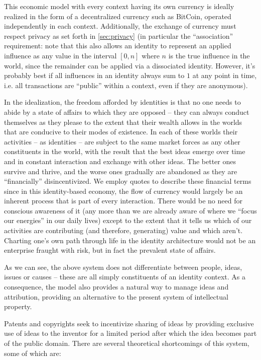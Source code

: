 \documentclass[pra,twocolumn,groupedaddress,10pt]{revtex4}
\theoremstyle{definition}
\begin{document}
This economic model with every context having its own currency is ideally realized in the form of a decentralized currency such as BitCoin\cite{bitcoin}, operated independently in each context. Additionally, the exchange of currency must respect privacy as set forth in \autoref{sec:privacy} (in particular the ``association'' requirement: note that this also allows an identity to represent an applied influence as any value in the interval $[0, n]$ where $n$ is the true influence in the world, since the remainder can be applied via a dissociated identity. However, it's probably best if all influences in an identity always sum to $1$ at any point in time, i.e. all transactions are ``public'' within a context, even if they are anonymous).

In the idealization, the freedom afforded by identities is that no one needs to abide by a state of affairs to which they are opposed -- they can always conduct themselves as they please to the extent that their wealth allows in the worlds that are conducive to their modes of existence. In each of these worlds their activities -- as identities -- are subject to the same market forces as any other constituents in the world, with the result that the best ideas emerge over time and in constant interaction and exchange with other ideas. The better ones survive and thrive, and the worse ones gradually are abandoned as they are ``financially'' disincentivized. We employ quotes to describe these financial terms since in this identity-based economy, the flow of currency would largely be an inherent process that is part of every interaction. There would be no need for conscious awareness of it (any more than we are already aware of where we ``focus our energies'' in our daily lives) except to the extent that it tells us which of our activities are contributing (and therefore, generating) value and which aren't. Charting one's own path through life in the identity architecture would not be an enterprise fraught with risk, but in fact the prevalent state of affairs.

As we can see, the above system does not differentiate between people, ideas, issues or causes -- these are all simply constituents of an identity context. As a consequence, the model also provides a natural way to manage ideas and attribution, providing an alternative to the present system of intellectual property.

Patents and copyrights seek to incentivize sharing of ideas by providing exclusive use of ideas to the inventor for a limited period after which the idea becomes part of the public domain. There are several theoretical shortcomings of this system, some of which are:
\end{document}
